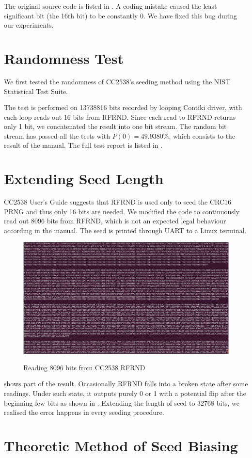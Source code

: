 The original source code is listed in . A coding mistake caused the least significant bit (the 16th bit) to be constantly 0. We have fixed this bug during our experiments.

\section{Randomness Test}
We first tested the randomness of CC2538's seeding method using the NIST Statistical Test Suite\cite{NistTestSuite}. 

The test is performed on 13738816 bits recorded by looping Contiki driver, with each loop reads out 16 bits from RFRND. Since each read to RFRND returns only 1 bit, we concatenated the result into one bit stream. The random bit stream has passed all the tests with $P(0) = 49.9380\%$, which consists to the result of the manual. The full test report is listed in .

\section{Extending Seed Length}

CC2538 User's Guide suggests that RFRND is used only to seed the CRC16 PRNG and thus only 16 bits are needed. We modified the code to continuously read out 8096 bits from RFRND, which is not an expected legal behaviour according in the manual. The seed is printed through UART to a Linux terminal.

\begin{figure}[ht!]
\center
\caption{Reading 8096 bits from CC2538 RFRND}
\includegraphics[width=\linewidth]{./figures/SeedExtend.png}
\label{RFRND8096}
\end{figure}

 shows part of the result. Occasionally RFRND falls into a broken state after some readings.  Under such state, it outputs purely 0 or 1 with  a potential flip after the beginning few bits as shown in . Extending the length of seed to 32768 bits, we realised the error happens in every seeding procedure.

\section{Theoretic Method of Seed Biasing}
